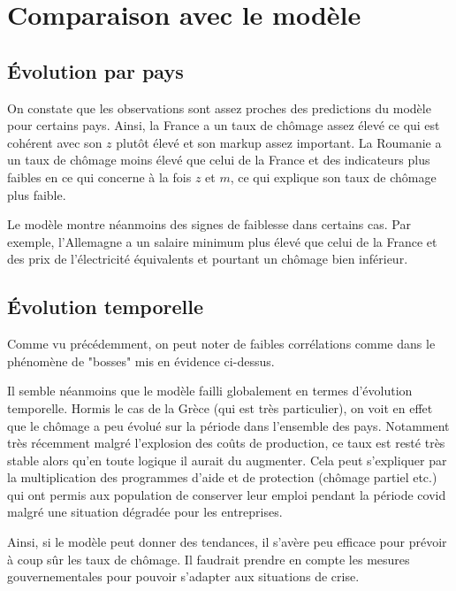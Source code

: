\documentclass{article}
\begin{document}
\section{Comparaison avec le modèle}

\subsection{Évolution par pays}
On constate que les observations sont assez proches des predictions du modèle pour certains pays. Ainsi, la France a un taux de chômage assez élevé ce qui est cohérent avec son $z$ plutôt élevé et son markup assez important. La Roumanie a un taux de chômage moins élevé que celui de la France et des indicateurs plus faibles en ce qui concerne à la fois $z$ et $m$, ce qui explique son taux de chômage plus faible.

Le modèle montre néanmoins des signes de faiblesse dans certains cas. Par exemple, l'Allemagne a un salaire minimum plus élevé que celui de la France et des prix de l'électricité équivalents et pourtant un chômage bien inférieur.

\subsection{Évolution temporelle}

Comme vu précédemment, on peut noter de faibles corrélations comme dans le phénomène de "bosses" mis en évidence ci-dessus.
\vspace{0.5cm}

Il semble néanmoins que le modèle failli globalement en termes d'évolution temporelle. Hormis le cas de la Grèce (qui est très particulier), on voit en effet que le chômage a peu évolué sur la période dans l'ensemble des pays. Notamment très récemment malgré l'explosion des coûts de production, ce taux est resté très stable alors qu'en toute logique il aurait du augmenter. Cela peut s'expliquer par la multiplication des programmes d'aide et de protection (chômage partiel etc.) qui ont permis aux population de conserver leur emploi pendant la période covid malgré une situation dégradée pour les entreprises. 
\vspace{0.5cm}

Ainsi, si le modèle peut donner des tendances, il s'avère peu efficace pour prévoir à coup sûr les taux de chômage. Il faudrait prendre en compte les mesures gouvernementales pour pouvoir s'adapter aux situations de crise.
\end{document}
